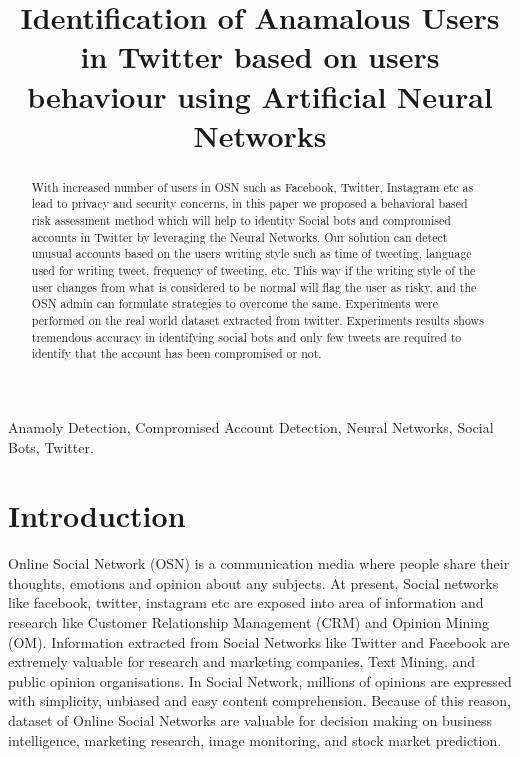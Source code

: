 \documentclass[conference]{IEEEtran}
\begin{document}
\title{Identification of Anamalous Users in Twitter based on users behaviour using Artificial Neural Networks}

\author{

}

\maketitle

\begin{abstract}

With increased number of users in OSN such as Facebook, Twitter, Instagram etc as lead to privacy and security concerns, in this paper we proposed a behavioral based risk assessment method which will help to identity Social bots and compromised accounts in Twitter by leveraging the Neural Networks.
Our solution can detect unusual accounts based on the users writing style such as time of tweeting, language used for writing tweet, frequency of tweeting, etc. This way if the writing style of the user changes 
from what is considered to be normal will flag the user as risky, and the OSN admin can formulate strategies to overcome the same. Experiments were performed 
on the real world dataset extracted from twitter. Experiments results shows tremendous accuracy in identifying social bots and  only few tweets are required to identify that the account has been compromised or not.

\end{abstract}

\begin{IEEEkeywords}

Anamoly Detection, Compromised Account Detection, Neural Networks, Social Bots, Twitter.

\end{IEEEkeywords}

\section{Introduction}

Online Social Network (OSN) is a communication media where people share their thoughts, emotions and opinion about any subjects. At present, Social networks like facebook, twitter, instagram etc are exposed
into area of information and research like Customer Relationship Management (CRM) and Opinion Mining (OM). Information extracted from Social Networks like Twitter and Facebook are extremely valuable for research
and marketing companies, Text Mining, and public opinion organisations.
In Social Network, millions of opinions are expressed with simplicity, unbiased and easy content comprehension. Because of this reason, dataset of Online Social Networks are valuable for decision making on 
business intelligence, marketing research,  image monitoring, and stock market prediction.
\end{document}
